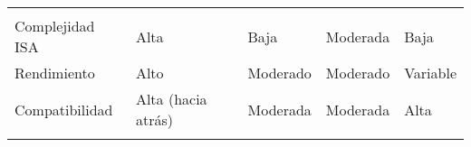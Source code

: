 \documentclass[12pt,twoside]{templates/unerthesis}
\begin{document}
\begin{longtable}[]{@{}lllll@{}}
\begin{minipage}[t]{0.20\columnwidth}
\end{minipage}\tabularnewline
\begin{minipage}[t]{0.17\columnwidth}\raggedright
Complejidad ISA\strut
\end{minipage} & \begin{minipage}[t]{0.18\columnwidth}\raggedright
Alta\strut
\end{minipage} & \begin{minipage}[t]{0.16\columnwidth}\raggedright
Baja\strut
\end{minipage} & \begin{minipage}[t]{0.15\columnwidth}\raggedright
Moderada\strut
\end{minipage} & \begin{minipage}[t]{0.20\columnwidth}\raggedright
Baja\strut
\end{minipage}\tabularnewline
\begin{minipage}[t]{0.17\columnwidth}\raggedright
Rendimiento\strut
\end{minipage} & \begin{minipage}[t]{0.18\columnwidth}\raggedright
Alto\strut
\end{minipage} & \begin{minipage}[t]{0.16\columnwidth}\raggedright
Moderado\strut
\end{minipage} & \begin{minipage}[t]{0.15\columnwidth}\raggedright
Moderado\strut
\end{minipage} & \begin{minipage}[t]{0.20\columnwidth}\raggedright
Variable\strut
\end{minipage}\tabularnewline
\begin{minipage}[t]{0.17\columnwidth}\raggedright
Compatibilidad\strut
\end{minipage} & \begin{minipage}[t]{0.18\columnwidth}\raggedright
Alta (hacia atrás)\strut
\end{minipage} & \begin{minipage}[t]{0.16\columnwidth}\raggedright
Moderada\strut
\end{minipage} & \begin{minipage}[t]{0.15\columnwidth}\raggedright
Moderada\strut
\end{minipage} & \begin{minipage}[t]{0.20\columnwidth}\raggedright
Alta\strut
\end{minipage}\tabularnewline
\begin{minipage}[t]{0.17\columnwidth}\raggedright

\end{minipage}
\end{longtable}
\end{document}
